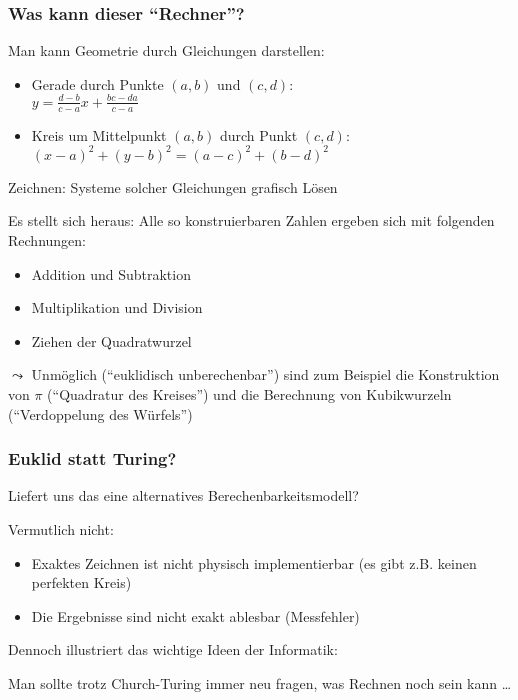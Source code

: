 \documentclass[onlymath]{beamer}
\begin{document}
\begin{frame}\frametitle{Was kann dieser "`Rechner"'?}
\pause

Man kann Geometrie durch Gleichungen darstellen:
\begin{itemize}
\item Gerade durch Punkte $(a,b)$ und $(c,d)$:\\ $y=\frac{d-b}{c-a}x + \frac{bc-da}{c-a}$
\item Kreis um Mittelpunkt $(a,b)$ durch Punkt $(c,d)$: $(x-a)^2 + (y-b)^2 = (a-c)^2 + (b-d)^2$
\end{itemize}

Zeichnen: Systeme solcher Gleichungen grafisch Lösen
\bigskip\pause

\alert{Es stellt sich heraus:} Alle so konstruierbaren Zahlen ergeben sich mit folgenden Rechnungen:
\begin{itemize}
\item Addition und Subtraktion
\item Multiplikation und Division
\item Ziehen der Quadratwurzel
\end{itemize}\pause

$\leadsto$ Unmöglich ("`euklidisch unberechenbar"') sind zum Beispiel die Konstruktion von $\pi$ (\alert{"`Quadratur des Kreises"'})
und die Berechnung von Kubikwurzeln (\alert{"`Verdoppelung des Würfels"'})

\end{frame}

\begin{frame}\frametitle{Euklid statt Turing?}

Liefert uns das eine alternatives Berechenbarkeitsmodell?\pause
\bigskip

\alert{Vermutlich nicht:}
\begin{itemize}
\item Exaktes Zeichnen ist nicht physisch implementierbar (es gibt z.B. keinen perfekten Kreis)
\item Die Ergebnisse sind nicht exakt ablesbar (Messfehler)
\end{itemize}\pause

Dennoch illustriert das wichtige Ideen der Informatik:\bigskip

\bigskip

Man sollte trotz Church-Turing immer neu fragen, was Rechnen noch sein kann \ldots

\end{frame}
\end{document}
